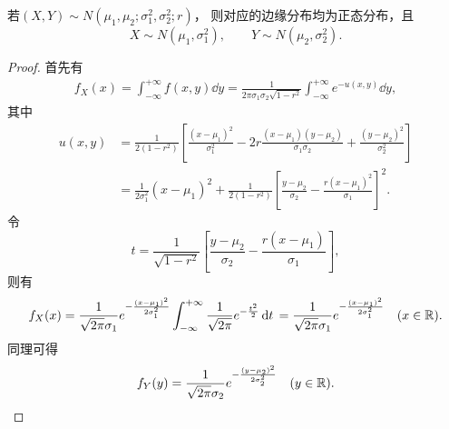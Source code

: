 \begin{theorem}\label{theorem:正态分布与自然指数分布族.性质1}
若\((X,Y) \sim N(\mu_1,\mu_2;\sigma_1^2,\sigma_2^2;r)\)，
则对应的边缘分布均为正态分布，且\begin{equation*}
	X \sim N(\mu_1,\sigma_1^2),
	\qquad
	Y \sim N(\mu_2,\sigma_2^2).
\end{equation*}
\begin{proof}
首先有\begin{align*}
	f_X(x) = \int_{-\infty}^{+\infty} f(x,y) \dd{y}
	= \frac{1}{2\pi\sigma_1\sigma_2\sqrt{1-r^2}}
		\int_{-\infty}^{+\infty} e^{-u(x,y)} \dd{y},
\end{align*}
其中\begin{align*}
	u(x,y)
	&= \frac{1}{2(1-r^2)} \left[
			\frac{(x-\mu_1)^2}{\sigma_1^2}
			-2r\frac{(x-\mu_1)(y-\mu_2)}{\sigma_1\sigma_2}
			+\frac{(y-\mu_2)^2}{\sigma_2^2}
		\right] \\
	&= \frac{1}{2 \sigma_1^2} (x-\mu_1)^2
		+ \frac{1}{2(1-r^2)} \left[
			\frac{y-\mu_2}{\sigma_2}
			- \frac{r(x-\mu_1)^2}{\sigma_1}
		\right]^2.
\end{align*}
令\begin{equation*}
	t = \frac{1}{\sqrt{1-r^2}} \left[
		\frac{y-\mu_2}{\sigma_2}
		- \frac{r(x-\mu_1)}{\sigma_1}
	\right],
\end{equation*}
则有\begin{equation*}
	f_X(x)
	= \frac{1}{\sqrt{2\pi} \sigma_1} e^{-\frac{(x-\mu_1)^2}{2\sigma_1^2}} \int_{-\infty}^{+\infty} \frac{1}{\sqrt{2\pi}} e^{-\frac{t^2}{2}} \dd{t} \\
	= \frac{1}{\sqrt{2\pi} \sigma_1} e^{-\frac{(x-\mu_1)^2}{2\sigma_1^2}}
	\quad(x\in\mathbb{R}).
\end{equation*}
同理可得\begin{equation*}
	f_Y(y)
	= \frac{1}{\sqrt{2\pi} \sigma_2} e^{-\frac{(y-\mu_2)^2}{2\sigma_2^2}}
	\quad(y\in\mathbb{R}).
	\qedhere
\end{equation*}
\end{proof}
\end{theorem}

